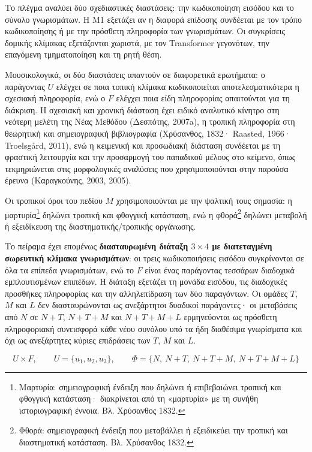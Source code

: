 \documentclass[11pt,a4paper]{article}
\begin{document}
Το πλέγμα αναλύει δύο σχεδιαστικές διαστάσεις: την κωδικοποίηση εισόδου και το σύνολο γνωρισμάτων. Η M1 εξετάζει αν η διαφορά επίδοσης συνδέεται με τον τρόπο κωδικοποίησης ή με την πρόσθετη πληροφορία των γνωρισμάτων. Οι συγκρίσεις δομικής κλίμακας εξετάζονται χωριστά, με τον Transformer γεγονότων, την επαγόμενη τμηματοποίηση και τη ρητή θέση.

Μουσικολογικά, οι δύο διαστάσεις απαντούν σε διαφορετικά ερωτήματα: ο παράγοντας \(U\) ελέγχει σε ποια τοπική κλίμακα κωδικοποιείται αποτελεσματικότερα η σχεσιακή πληροφορία, ενώ ο \(F\) ελέγχει ποια είδη πληροφορίας απαιτούνται για τη διάκριση. Η σχεσιακή και χρονική διάσταση έχει ειδικό αναλυτικό κίνητρο στη νεότερη μελέτη της Νέας Μεθόδου (Δεσπότης, 2007a), η τροπική πληροφορία στη θεωρητική και σημειογραφική βιβλιογραφία (Χρύσανθος, 1832· Raasted, 1966· Troelsgård, 2011), ενώ η κειμενική και προσωδιακή διάσταση συνδέεται με τη φραστική λειτουργία και την προσαρμογή του παπαδικού μέλους στο κείμενο, όπως τεκμηριώνεται στις μορφολογικές αναλύσεις που χρησιμοποιούνται στην παρούσα έρευνα (Καραγκούνης, 2003, 2005).

Οι τροπικοί όροι του πεδίου $M$ χρησιμοποιούνται με την ψαλτική τους σημασία: η μαρτυρία\footnote{Μαρτυρία: σημειογραφική ένδειξη που δηλώνει ή επιβεβαιώνει τροπική και φθογγική κατάσταση· διακρίνεται από τη «μαρτυρία» με τη συνήθη ιστοριογραφική έννοια. Βλ. Χρύσανθος 1832.} δηλώνει τροπική και φθογγική κατάσταση, ενώ η φθορά\footnote{Φθορά: σημειογραφική ένδειξη που μεταβάλλει ή εξειδικεύει την τροπική και διαστηματική κατάσταση. Βλ. Χρύσανθος 1832.} δηλώνει μεταβολή ή εξειδίκευση της διαστηματικής/τροπικής οργάνωσης.\par

Το πείραμα έχει επομένως \textbf{διασταυρωμένη διάταξη \(3\times4\) με διατεταγμένη σωρευτική κλίμακα γνωρισμάτων}: οι τρεις κωδικοποιήσεις εισόδου συγκρίνονται σε όλα τα επίπεδα γνωρισμάτων, ενώ το \(F\) είναι ένας παράγοντας τεσσάρων διαδοχικά εμπλουτισμένων επιπέδων. Η διάταξη εξετάζει τη μονάδα εισόδου, τις διαδοχικές προσθήκες πληροφορίας και την αλληλεπίδραση των δύο παραγόντων. Οι ομάδες \(T\), \(M\) και \(L\) δεν διασταυρώνονται ως ανεξάρτητοι δυαδικοί παράγοντες· οι μεταβάσεις από \(N\) σε \(N{+}T\), \(N{+}T{+}M\) και \(N{+}T{+}M{+}L\) ερμηνεύονται ως πρόσθετη πληροφοριακή συνεισφορά κάθε νέου συνόλου υπό τα ήδη διαθέσιμα γνωρίσματα και όχι ως ανεξάρτητες κύριες επιδράσεις των \(T\), \(M\) και \(L\).

\[
U \times F,\qquad
U=\{u_1,u_2,u_3\},\qquad
\Phi=\{N,\ N{+}T,\ N{+}T{+}M,\ N{+}T{+}M{+}L\}
\]
\end{document}
